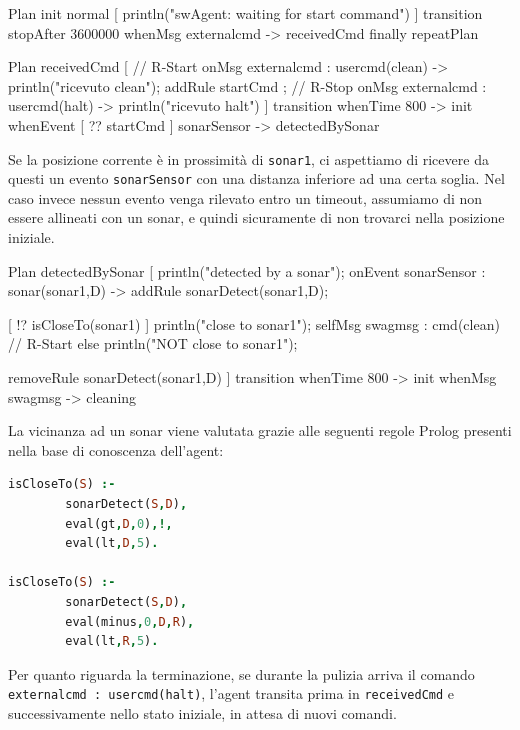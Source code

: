\documentclass{../llncs}
\newcommand{\codescript}[1]{{\mbox{\small{\texttt{#1}}}}\xspace}
\newcommand{\code}[1]{{\color{blue}\small{\texttt{#1}}}}
\begin{document}
\begin{qacode}[caption={SoftwareAgent, pt1}]
Plan init normal [
   	println("swAgent: waiting for start command")
]
transition stopAfter 3600000
	whenMsg externalcmd -> receivedCmd
finally repeatPlan

Plan receivedCmd [
	// R-Start
	onMsg externalcmd : usercmd(clean) -> {
   		println("ricevuto clean");
   		addRule startCmd
	};
	// R-Stop
   	onMsg externalcmd : usercmd(halt) -> println("ricevuto halt")
]
transition
	whenTime 800 -> init
	whenEvent [ ?? startCmd ] sonarSensor -> detectedBySonar
\end{qacode}

Se la posizione corrente è in prossimità di \code{sonar1}, ci aspettiamo di ricevere da questi un evento \codescript{sonarSensor} con una distanza inferiore ad una certa soglia. Nel caso invece nessun evento venga rilevato entro un timeout, assumiamo di non essere allineati con un sonar, e quindi sicuramente di non trovarci nella posizione iniziale.\\

\begin{qacode}[caption={SoftwareAgent, pt2}]
Plan detectedBySonar [
	println("detected by a sonar");
	onEvent sonarSensor : sonar(sonar1,D) -> addRule sonarDetect(sonar1,D);
	
	[ !? isCloseTo(sonar1) ] {
		println("close to sonar1");
		selfMsg swagmsg : cmd(clean) // R-Start
	}
	else
		println("NOT close to sonar1");
		
	removeRule sonarDetect(sonar1,D)
]
transition
	whenTime 800 -> init
	whenMsg swagmsg -> cleaning
\end{qacode}

La vicinanza ad un sonar viene valutata grazie alle seguenti regole Prolog presenti nella base di conoscenza dell'agent:\\

\begin{lstlisting}[language=Prolog, keywordstyle=\color{black}, caption={SoftwareAgent, Rules - pt1}]
isCloseTo(S) :-
		sonarDetect(S,D),
		eval(gt,D,0),!,
		eval(lt,D,5).
	
isCloseTo(S) :-
		sonarDetect(S,D),
		eval(minus,0,D,R),
		eval(lt,R,5).
\end{lstlisting}

\vspace{8px}

Per quanto riguarda la terminazione, se durante la pulizia arriva il comando \codescript{externalcmd : usercmd(halt)}, l'agent transita prima in \codescript{receivedCmd} e successivamente nello stato iniziale, in attesa di nuovi comandi.\\
\end{document}
